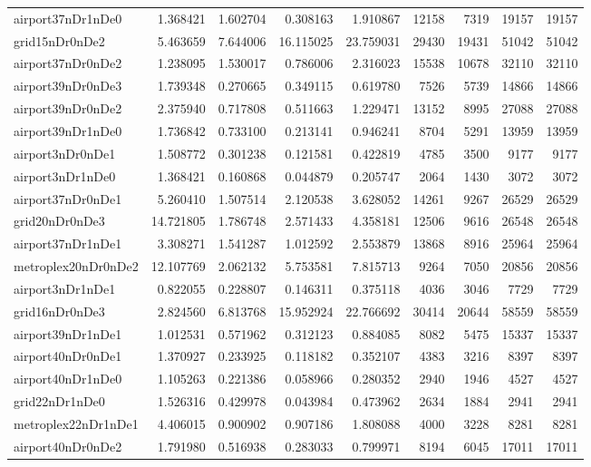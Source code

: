 \begin{longtable}{|l|r|r|r|r|r|r|r|r|}
airport37nDr1nDe0 & 1.368421 & 1.602704 & 0.308163 & 1.910867 & 12158 & 7319 & 19157 & 19157 \\
grid15nDr0nDe2 & 5.463659 & 7.644006 & 16.115025 & 23.759031 & 29430 & 19431 & 51042 & 51042 \\
airport37nDr0nDe2 & 1.238095 & 1.530017 & 0.786006 & 2.316023 & 15538 & 10678 & 32110 & 32110 \\
airport39nDr0nDe3 & 1.739348 & 0.270665 & 0.349115 & 0.619780 & 7526 & 5739 & 14866 & 14866 \\
airport39nDr0nDe2 & 2.375940 & 0.717808 & 0.511663 & 1.229471 & 13152 & 8995 & 27088 & 27088 \\
airport39nDr1nDe0 & 1.736842 & 0.733100 & 0.213141 & 0.946241 & 8704 & 5291 & 13959 & 13959 \\
airport3nDr0nDe1 & 1.508772 & 0.301238 & 0.121581 & 0.422819 & 4785 & 3500 & 9177 & 9177 \\
airport3nDr1nDe0 & 1.368421 & 0.160868 & 0.044879 & 0.205747 & 2064 & 1430 & 3072 & 3072 \\
airport37nDr0nDe1 & 5.260410 & 1.507514 & 2.120538 & 3.628052 & 14261 & 9267 & 26529 & 26529 \\
grid20nDr0nDe3 & 14.721805 & 1.786748 & 2.571433 & 4.358181 & 12506 & 9616 & 26548 & 26548 \\
airport37nDr1nDe1 & 3.308271 & 1.541287 & 1.012592 & 2.553879 & 13868 & 8916 & 25964 & 25964 \\
metroplex20nDr0nDe2 & 12.107769 & 2.062132 & 5.753581 & 7.815713 & 9264 & 7050 & 20856 & 20856 \\
airport3nDr1nDe1 & 0.822055 & 0.228807 & 0.146311 & 0.375118 & 4036 & 3046 & 7729 & 7729 \\
grid16nDr0nDe3 & 2.824560 & 6.813768 & 15.952924 & 22.766692 & 30414 & 20644 & 58559 & 58559 \\
airport39nDr1nDe1 & 1.012531 & 0.571962 & 0.312123 & 0.884085 & 8082 & 5475 & 15337 & 15337 \\
airport40nDr0nDe1 & 1.370927 & 0.233925 & 0.118182 & 0.352107 & 4383 & 3216 & 8397 & 8397 \\
airport40nDr1nDe0 & 1.105263 & 0.221386 & 0.058966 & 0.280352 & 2940 & 1946 & 4527 & 4527 \\
grid22nDr1nDe0 & 1.526316 & 0.429978 & 0.043984 & 0.473962 & 2634 & 1884 & 2941 & 2941 \\
metroplex22nDr1nDe1 & 4.406015 & 0.900902 & 0.907186 & 1.808088 & 4000 & 3228 & 8281 & 8281 \\
airport40nDr0nDe2 & 1.791980 & 0.516938 & 0.283033 & 0.799971 & 8194 & 6045 & 17011 & 17011 \\

\end{longtable}
